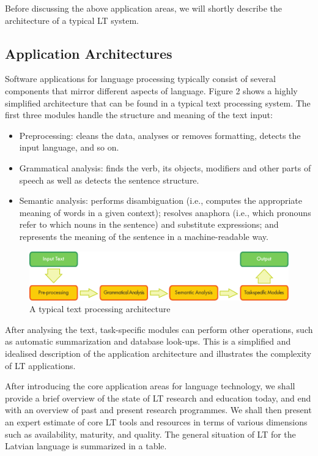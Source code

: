 \begin{multicols}{2}
Before discussing the above application areas, we will shortly describe the architecture of a typical LT system.

\subsection{Application Architectures}
Software applications for language processing typically consist of several components that mirror different aspects of language.
Figure 2 shows a highly simplified architecture that can be found in a typical text processing system.
The first three modules handle the structure and meaning of the text input:

\begin{itemize}
\item  Preprocessing: cleans the data, analyses or removes formatting, detects the input language, and so on.
\item  Grammatical analysis: finds the verb, its objects, modifiers and other parts of speech as well as detects the sentence structure.
\item  Semantic analysis: performs disambiguation (i.e., computes the appropriate meaning of words in a given context); resolves anaphora (i.e., which pronouns refer to which nouns in the sentence) and substitute expressions; and represents the meaning of the sentence in a machine-readable way.
\end{itemize}

\begin{figure}[htb]
  \center
  \includegraphics[width=\textwidth]{../_media/english/text_processing_app_architecture}
  \caption{A typical text processing architecture}
  \label{fig:textprocessingarch_en}
\end{figure}

After analysing the text, task-specific modules can perform other operations, such as automatic summarization and database look-ups.
This is a simplified and idealised description of the application architecture and illustrates the complexity of LT applications.

After introducing the core application areas for language technology, we shall provide a brief overview of the state of LT research and education today, and end with an overview of past and present research programmes.
We shall then present an expert estimate of core LT tools and resources in terms of various dimensions such as availability, maturity, and quality.
The general situation of LT for the Latvian language is summarized in a table.


\end{multicols}
